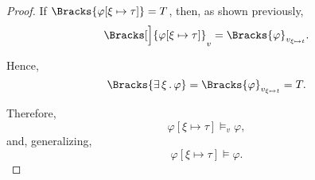 \begin{proof}
   If \( \Bracks{\varphi[\xi \mapsto \tau]} = T \), then, as shown previously,
  \begin{equation*}
    \Bracks[\Big]{\varphi[\xi \mapsto \tau]}_v = \Bracks{\varphi}_{v_{\xi \mapsto t}}.
  \end{equation*}

  Hence,
  \begin{equation*}
    \Bracks{\qexists \xi \varphi} = \Bracks{\varphi}_{v_{\xi \mapsto t}} = T.
  \end{equation*}

  Therefore,
  \begin{equation*}
    \varphi[\xi \mapsto \tau] \vDash_v \varphi,
  \end{equation*}
  and, generalizing,
  \begin{equation*}
    \varphi[\xi \mapsto \tau] \vDash \varphi.
  \end{equation*}
\end{proof}

